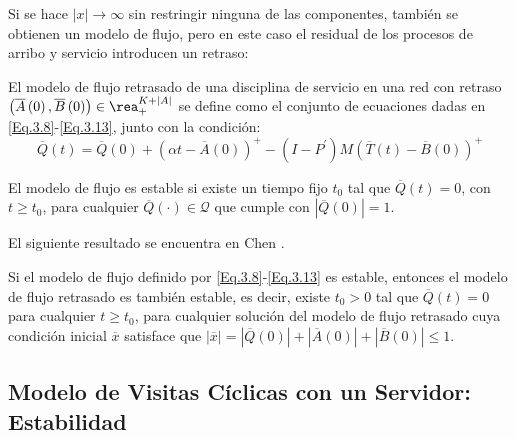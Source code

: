 Si se hace $|x|\rightarrow\infty$ sin restringir ninguna de las
componentes, tambi\'en se obtienen un modelo de flujo, pero en
este caso el residual de los procesos de arribo y servicio
introducen un retraso:

\begin{Def}
El modelo de flujo retrasado de una disciplina de servicio en una
red con retraso
$\left(\overline{A}\left(0\right),\overline{B}\left(0\right)\right)\in\rea_{+}^{K+|A|}$
se define como el conjunto de ecuaciones dadas en
\ref{Eq.3.8}-\ref{Eq.3.13}, junto con la condici\'on:
\begin{equation}\label{CondAd.FluidModel}
\overline{Q}\left(t\right)=\overline{Q}\left(0\right)+\left(\alpha
t-\overline{A}\left(0\right)\right)^{+}-\left(I-P^{'}\right)M\left(\overline{T}\left(t\right)-\overline{B}\left(0\right)\right)^{+}
\end{equation}
\end{Def}

\begin{Def}
El modelo de flujo es estable si existe un tiempo fijo $t_{0}$ tal
que $\overline{Q}\left(t\right)=0$, con $t\geq t_{0}$, para
cualquier $\overline{Q}\left(\cdot\right)\in\mathcal{Q}$ que
cumple con $|\overline{Q}\left(0\right)|=1$.
\end{Def}

El siguiente resultado se encuentra en Chen \cite{Chen}.
\begin{Lemma}
Si el modelo de flujo definido por \ref{Eq.3.8}-\ref{Eq.3.13} es
estable, entonces el modelo de flujo retrasado es tambi\'en
estable, es decir, existe $t_{0}>0$ tal que
$\overline{Q}\left(t\right)=0$ para cualquier $t\geq t_{0}$, para
cualquier soluci\'on del modelo de flujo retrasado cuya
condici\'on inicial $\overline{x}$ satisface que
$|\overline{x}|=|\overline{Q}\left(0\right)|+|\overline{A}\left(0\right)|+|\overline{B}\left(0\right)|\leq1$.
\end{Lemma}

\subsection{Modelo de Visitas C\'iclicas con un Servidor: Estabilidad}

